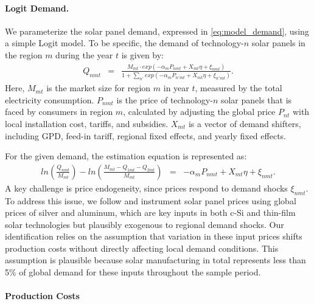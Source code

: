 \documentclass[12pt]{article}
\begin{document}
\paragraph{Logit Demand.}
We parameterize the solar panel demand, expressed in \eqref{eq:model_demand}, using a simple Logit model. To be specific, the demand of technology-$n$ solar panels in the region $m$ during the year $t$ is given by:
\begin{eqnarray*}
Q_{nmt} & = & \frac{M_{mt}\cdot exp(-\alpha_{m} P_{nmt} + X_{mt}\eta +\xi_{nmt})}{1+\sum_{n'}exp(-\alpha_{m} P_{n'mt} + X_{mt}\eta +\xi_{n'mt})}.  \label{eq:demand_specification}
\end{eqnarray*}
Here, $M_{mt}$ is the market size for region $m$ in year $t$, measured by the total electricity consumption. $P_{nmt}$ is the price of technology-$n$ solar panels that is faced by consumers in region $m$, calculated by adjusting the global price $P_{nt}$ with local installation cost, tariffs, and subsidies. $X_{mt}$ is a vector of demand shifters, including GPD, feed-in tariff, regional fixed effects, and yearly fixed effects. 

For the given demand, the estimation equation is represented as:
\begin{eqnarray}
ln( \frac{Q_{nmt}}{M_{mt}} ) - ln( \frac{M_{mt}- Q_{1mt}- Q_{2mt}}{M_{mt}} ) & = &  -\alpha_{m} P_{nmt} + X_{mt}\eta +\xi_{nmt}. \label{eq:demand_est_mkt}
\end{eqnarray}
A key challenge is price endogeneity, since prices respond to demand shocks $\xi_{nmt}$. To address this issue, we follow \citet{bollinger2025strategic} and instrument solar panel prices using global prices of silver and aluminum, which are key inputs in both c-Si and thin-film solar technologies but plausibly exogenous to regional demand shocks. Our identification relies on the assumption that variation in these input prices shifts production costs without directly affecting local demand conditions. This assumption is plausible because solar manufacturing in total represents less than 5\% of global demand for these inputs throughout the sample period.



\paragraph{Production Costs} 
\end{document}
